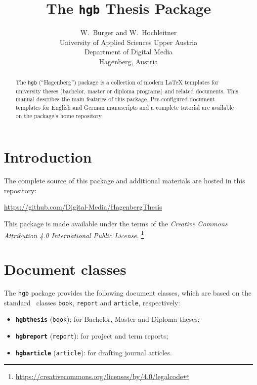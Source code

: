 \documentclass[english]{hgbarticle}
\title{The \texttt{hgb} Thesis Package}
\date{\hgbDate}
\author{W.\ Burger and W.\ Hochleitner\\[10pt]
University of Applied Sciences Upper Austria\\
Department of Digital Media\\
Hagenberg, Austria}
\begin{document}
\maketitle

\begin{abstract}\noindent
The \texttt{hgb} (``Hagenberg'') package is a collection of modern LaTeX templates for university theses (bachelor, 
master or diploma programs) and related documents.
This manual describes the main features of this package.
Pre-configured document templates for English and German manuscripts and a complete
tutorial are available on the package's home repository.
\end{abstract}



\section{Introduction}

The complete source of this package and additional materials are hosted in this 
repository:
%
\begin{center}
\url{https://github.com/Digital-Media/HagenbergThesis}
\end{center}
This package is made available under the terms of the
\emph{Creative Commons Attribution 4.0 International Public License}.%
\footnote{\url{https://creativecommons.org/licenses/by/4.0/legalcode}}


\section{Document classes}

The \texttt{hgb} package provides the following document classes,
which are based on the standard \latex\ classes
\texttt{book}, \texttt{report} and \texttt{article}, respectively:
%
\begin{itemize}
\item \textbf{\texttt{hgbthesis}} (\texttt{book}): 
for Bachelor, Master and Diploma theses;
\item \textbf{\texttt{hgbreport}} (\texttt{report}):
for project and term reports;
\item \textbf{\texttt{hgbarticle}} (\texttt{article}):
for drafting journal articles.
\end{itemize}
\end{document}
